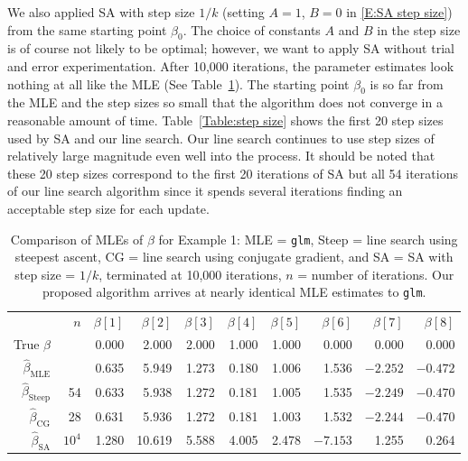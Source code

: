 We also applied  SA with step size $1/k$ (setting $A=1$, $B=0$ in \eqref{E:SA step 
size}) from the same starting point 
$\beta_0$.  The choice of constants $A$ and $B$ in the step size is of course not 
likely to be optimal;
however, we want to apply SA without trial and error experimentation.  
After 10,000 iterations, the parameter estimates look nothing at all like the MLE (See 
Table~\ref{Table:Logistic}).  
The starting point $\beta_0$ is so far from the MLE and the step sizes so small that 
the algorithm does not converge in a reasonable amount of time.
Table~\ref{Table:step size} shows the first 20 step sizes used by SA and our line 
search. Our line search continues to 
use step sizes of relatively large magnitude even well into the process.  It should be 
noted that these 20 step sizes 
correspond to the first 20 iterations of SA but all 54 iterations of our line search 
algorithm since it spends several 
iterations finding an acceptable step size for each update.


\begin{table}
\caption{Comparison of MLEs of $\beta$ for Example 1: MLE = \texttt{glm}, Steep = line 
search using steepest ascent, 
CG = line search using conjugate gradient, and SA =  SA with step size = $1/k$, 
terminated at 10,000 iterations,
$n$ = number of iterations.  Our 
proposed algorithm arrives at nearly identical MLE estimates to \texttt{glm}.}
\begin{center}
\begin{tabular}{rrrrrrrrrr}
  \hline
 & $n$ & $\beta[1]$ & $\beta[2]$ & $\beta[3]$ & $\beta[4]$ & $\beta[5]$ & $\beta[6]$ & 
$\beta[7]$ & $\beta[8]$ \\ 
True $\beta$ & & 0.000 & 2.000 & 2.000 & 1.000 & 1.000 & 0.000 & 0.000 & 0.000 \\ 
  $\hat{\beta}_{\textrm{MLE}}$ & & 0.635 & 5.949 & 1.273 & 0.180 & 1.006 & 1.536 & 
$-2.252$ & $-0.472$ \\ 
  $\hat{\beta}_{\textrm{Steep}}$ & 54 & 0.633 & 5.938 & 1.272 & 0.181 & 1.005 & 1.535 
& $-2.249$ & $-0.470$ \\ 
  $\hat{\beta}_{\textrm{CG}}$ & 28 & 0.631 & 5.936 & 1.272 & 0.181 & 1.003 & 1.532 & 
$-2.244$ & $-0.470$ \\    
  $\hat{\beta}_{\textrm{SA}}$ & $10^4$ & 1.280 & 10.619 & 5.588 & 4.005 & 2.478 & 
$-7.153$ & 1.255 & 0.264 \\ 
  \hline
\end{tabular}
\end{center}
\label{Table:Logistic}
\end{table}

